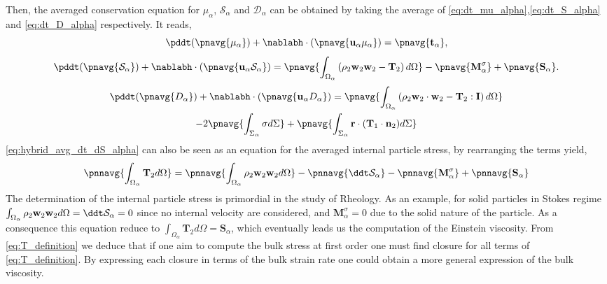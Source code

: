 Then, the averaged conservation equation for $\mu_\alpha$, $\mathcal{S}_\alpha$ and $\mathcal{D}_\alpha$ can be obtained by taking the average of \ref{eq:dt_mu_alpha},\ref{eq:dt_S_alpha} and \ref{eq:dt_D_alpha} respectively.
It reads,
\begin{equation}
    \pddt (\pnavg{\mu_\alpha})
    + \nablabh\cdot (\pnavg{  \textbf{u}_\alpha \mu_\alpha})
    =  
    \pnavg{\textbf{t}_\alpha},
    \label{eq:hybrid_avg_dt_dmu_alpha}
\end{equation}
\begin{multline}    
    \pddt (\pnavg{\mathcal{S}_\alpha})
    + \nablabh\cdot (\pnavg{  \textbf{u}_\alpha \mathcal{S}_\alpha})
    =  \pnavg{\int_{\Omega_\alpha} \left(
        \rho_2\textbf{w}_2 \textbf{w}_2
        - \mathbf{T}_2
        \right) d\Omega}
        - \pnavg{\textbf{M}_\alpha^\sigma}
        + \pnavg{\textbf{S}_\alpha}.
    \label{eq:hybrid_avg_dt_dS_alpha}
\end{multline}
\begin{multline}
    \pddt (\pnavg{D_\alpha})
    + \nablabh\cdot (\pnavg{  \textbf{u}_\alpha D_\alpha})
    = \pnavg{\int_{\Omega_\alpha} \left(
        \rho_2 \textbf{w}_2 \cdot \textbf{w}_2
        - \mathbf{T}_2 : \textbf{I}
        \right) d\Omega}\\
        - 2\pnavg{\int_{\Sigma_\alpha} \sigma d\Sigma}
        + \pnavg{\int_{\Sigma_\alpha} \textbf{r}\cdot(\textbf{T}_1\cdot\textbf{n}_2) d\Sigma}
    \label{eq:hybrid_avg_dt_dD_alpha}
\end{multline}
\ref{eq:hybrid_avg_dt_dS_alpha} can also be seen as an equation for the averaged internal particle stress, by rearranging the terms yield, 
\begin{equation}    
    \pnnavg{\int_{\Omega_\alpha}\mathbf{T}_2d\Omega}
    = \pnnavg{ \int_{\Omega_\alpha} \rho_2 \textbf{w}_2 \textbf{w}_2d\Omega}
    - \pnnavg{ \ddt \mathcal{S}_\alpha}
    - \pnnavg{ \textbf{M}_\alpha^\sigma}
    + \pnnavg{  \textbf{S}_\alpha}
    \label{eq:T_definition}
\end{equation}
The determination of the internal particle stress is primordial in the study of Rheology.
As an example, for solid particles in Stokes regime $\int_{\Omega_\alpha} \rho_2 \textbf{w}_2 \textbf{w}_2d\Omega =  \ddt \mathcal{S}_\alpha = 0$ since no internal velocity are considered, and $\textbf{M}_\alpha^\sigma=0$ due to the solid nature of the particle. 
As a consequence this equation reduce to $\int_{\Omega_\alpha}\mathbf{T}_2d\Omega = \textbf{S}_\alpha$, which eventually leads us the computation of the Einstein viscosity. 
From \ref{eq:T_definition} we deduce that if one aim to compute the bulk stress at first order one must find closure for all terms of \ref{eq:T_definition}. 
By expressing each closure in terms of the bulk strain rate one could obtain a more general expression of the bulk viscosity. 



